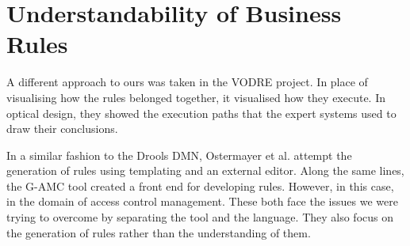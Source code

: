 \section{Understandability of Business Rules}  

A different approach to ours was taken in the VODRE project\cite{lapaev2014vodre}.
In place of visualising how the rules belonged together, it visualised how they execute.
In optical design, they showed the execution paths that the expert systems used to draw their conclusions.

In a similar fashion to the Drools DMN, Ostermayer et al.\cite{ostermayer2013simplifying} attempt the generation of rules using templating and an external editor.
Along the same lines, the G-AMC tool\cite{sa2016g} created a front end for developing rules.
However, in this case, in the domain of access control management.
These both face the issues we were trying to overcome by separating the tool and the language. 
They also focus on the generation of rules rather than the understanding of them.
